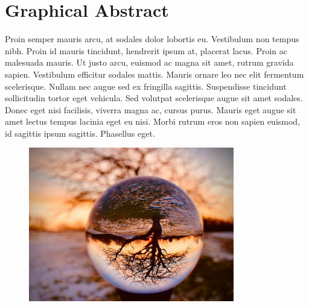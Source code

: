 
\chapter*{Graphical Abstract}

Proin semper mauris arcu, at sodales dolor lobortis eu. Vestibulum non tempus nibh. Proin id mauris tincidunt, hendrerit ipsum at, placerat lacus. Proin ac malesuada mauris. Ut justo arcu, euismod ac magna sit amet, rutrum gravida sapien. Vestibulum efficitur sodales mattis. Mauris ornare leo nec elit fermentum scelerisque. Nullam nec augue sed ex fringilla sagittis. Suspendisse tincidunt sollicitudin tortor eget vehicula. Sed volutpat scelerisque augue sit amet sodales. Donec eget nisi facilisis, viverra magna ac, cursus purus. Mauris eget augue sit amet lectus tempus lacinia eget eu nisi. Morbi rutrum eros non sapien euismod, id sagittis ipsum sagittis. Phasellus eget.


\begin{figure}[h]
\centering
\includegraphics[width=0.8\textwidth]{fig/_117310488_16.jpg}
\end{figure}

